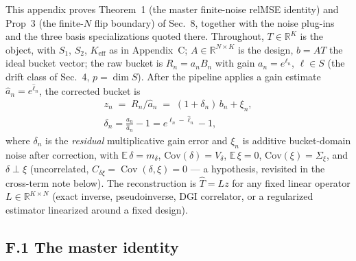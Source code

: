 This appendix proves Theorem~1 (the master finite-noise relMSE identity) and Prop~3 (the finite-$N$ flip boundary) of Sec.~8, together with the noise plug-ins and the three basis specializations quoted there. Throughout, $T\in\mathbb{R}^K$ is the object, with $S_1$, $S_2$, $K_{\mathrm{eff}}$ as in Appendix~C; $A\in\mathbb{R}^{N\times K}$ is the design, $b=AT$ the ideal bucket vector; the raw bucket is $R_n=a_nB_n$ with gain $a_n=e^{\ell_n}$, $\ell\in S$ (the drift class of Sec.~4, $p=\dim S$). After the pipeline applies a gain estimate $\hat a_n=e^{\hat\ell_n}$, the corrected bucket is
\begin{equation}
\begin{gathered}
z_n \;=\; R_n/\hat a_n \;=\; (1+\delta_n)\,b_n+\xi_n,\\
\delta_n=\frac{a_n}{\hat a_n}-1=e^{\ell_n-\hat\ell_n}-1,
\end{gathered}
\tag{F.1}
\end{equation}
where $\delta_n$ is the \emph{residual} multiplicative gain error and $\xi_n$ is additive bucket-domain noise after correction, with $\mathbb{E}\,\delta=m_\delta$, $\mathrm{Cov}(\delta)=V_\delta$, $\mathbb{E}\,\xi=0$, $\mathrm{Cov}(\xi)=\Sigma_\xi$, and $\delta\perp\xi$ (uncorrelated, $C_{\delta\xi}=\operatorname{Cov}(\delta,\xi)=0$ --- a hypothesis, revisited in the cross-term note below). The reconstruction is $\hat T=Lz$ for any fixed linear operator $L\in\mathbb{R}^{K\times N}$ (exact inverse, pseudoinverse, DGI correlator, or a regularized estimator linearized around a fixed design).

\subsection{F.1 The master identity}

